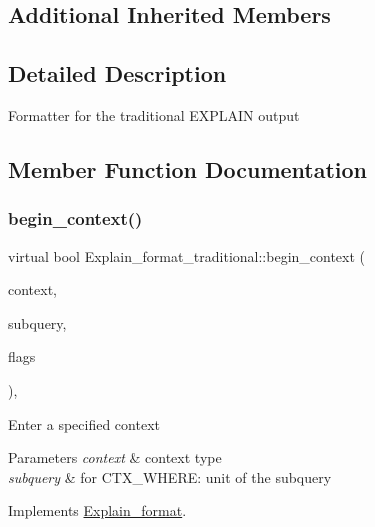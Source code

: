 \subsection*{Additional Inherited Members}


\subsection{Detailed Description}
Formatter for the traditional E\+X\+P\+L\+A\+IN output 

\subsection{Member Function Documentation}
\mbox{\label{classExplain__format__traditional_a6919bd25e9feb9954a2fa4f06c8a4f5c}} 
\subsubsection{\texorpdfstring{begin\+\_\+context()}{begin\_context()}}
{\footnotesize\ttfamily virtual bool Explain\+\_\+format\+\_\+traditional\+::begin\+\_\+context (\begin{DoxyParamCaption}\item[{enum\+\_\+parsing\+\_\+context}]{context,  }\item[{S\+E\+L\+E\+C\+T\+\_\+\+L\+E\+X\+\_\+\+U\+N\+IT $\ast$}]{subquery,  }\item[{const \mbox{\hyperlink{classExplain__format__flags}{Explain\+\_\+format\+\_\+flags}} $\ast$}]{flags }\end{DoxyParamCaption})\hspace{0.3cm}{\ttfamily [inline]}, {\ttfamily [virtual]}}

Enter a specified context


\begin{DoxyParams}{Parameters}
{\em context} & context type \\
\hline
{\em subquery} & for C\+T\+X\+\_\+\+W\+H\+E\+RE\+: unit of the subquery \\
\hline
\end{DoxyParams}


Implements \mbox{\hyperlink{classExplain__format_aedfa1f1b941f522948707e4fa3368f79}{Explain\+\_\+format}}.

